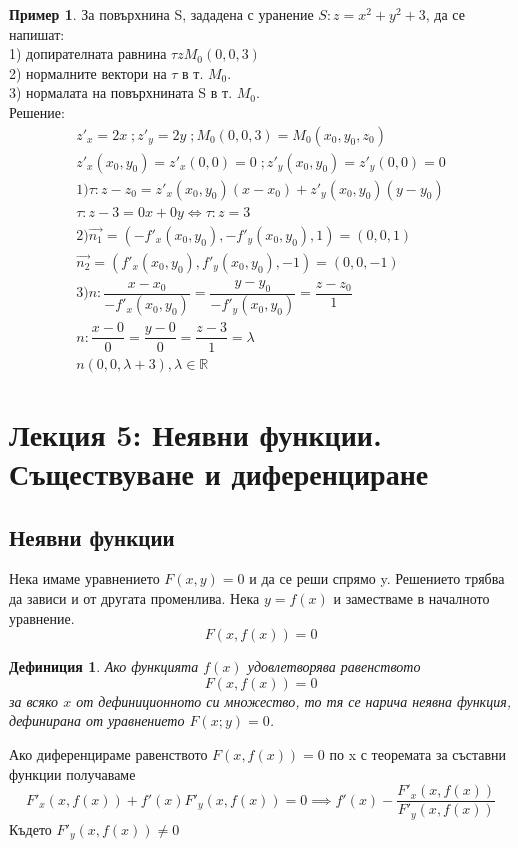 \documentclass[a4paper,fleqn,12pt]{article}
\newtheorem{definition}{Дефиниция}[subsection]
\theoremstyle{definition}
\newtheorem{example}{Пример}[subsection]
\begin{document}
\begin{example}
За повърхнина S, зададена с уранение $S: z= x^2 + y^2 + 3$, да се напишат: \\
1) допирателната равнина $\tau z  M_0 (0, 0, 3)$ \\
2) нормалните вектори на $\tau$ в т. $M_0$.\\
3) нормалата на повърхнината S в т. $M_0$. \\
Решение:
\begin{gather*}
z'_x = 2x\; ; z'_y = 2y\; ; M_0(0,0,3) = M_0(x_0, y_0, z_0) \\
z'_x(x_0, y_0) = z'_x(0,0) = 0\; ; z'_y(x_0, y_0) = z'_y(0,0) = 0\\
1) \tau : z - z_0 = z'_x (x_0, y_0)(x - x_0) + z'_y (x_0, y_0)(y - y_0) \\
\tau : z - 3 = 0x + 0y \iff  \tau: z = 3\\
2)
\vec {n_1} = (-f'_x (x_0, y_0), -f'_y (x_0, y_0), 1) = (0, 0, 1) \\
\vec {n_2} = (f'_x (x_0, y_0), f'_y (x_0, y_0), -1) = (0, 0, -1) \\
3) 
n: \dfrac{x - x_0}{-f'_x (x_0, y_0)} = \dfrac{y-y_0}{-f'_y (x_0, y_0)} = \dfrac{z - z_0}{1} \\
n: \dfrac{x - 0}{0} = \dfrac{y-0}{0} = \dfrac{z - 3}{1} = \lambda \\
n (0, 0, \lambda + 3), \lambda \in \mathbb{R}
\end{gather*}
\end{example}

\newpage

\section{Лекция 5: Неявни функции. Съществуване и диференциране }

\subsection{Неявни функции}
Нека имаме уравнението $F(x,y) = 0$ и да се реши спрямо y. Решението трябва да зависи и от другата променлива. Нека $y = f(x)$ и заместваме в началното уравнение. 
$$F(x,f(x)) = 0$$

\begin{definition}
Ако функцията $f(x)$ удовлетворява равенството 
$$F(x,f(x)) = 0$$
за всяко $x$ от дефиниционното си множество, то тя се нарича неявна функция, дефинирана от уравнението $F(x;y) = 0$.
\end{definition}
Ако диференцираме равенството $F(x,f(x)) = 0$ по x с теоремата за съставни функции получаваме 
$$F'_x(x,f(x)) + f'(x)F'_y(x,f(x)) = 0 \implies f'(x) - \dfrac{F'_x(x,f(x))}{F'_y(x,f(x))}$$
Където $F'_y(x,f(x)) \neq 0$
\end{document}

